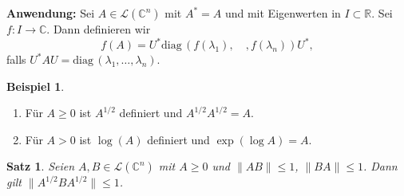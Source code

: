 \documentclass[
paper=a4,
bibtotocnumbered,
liststotocnumbered,
tablecaptionabove,
pointlessnumbers,
twoside,
openright,
10pt
]
{report}
\newcommand{\diag}{\mathrm{diag}\,}
\newtheorem{satz}[thm]{Satz}
\theoremstyle{definition}
\newtheorem*{bsp}{Beispiel}
\numberwithin{equation}{chapter}
\begin{document}
\textbf{Anwendung:} Sei $A\in \mathcal L(\mathbb C^n)$ mit $A^*=A$ und mit Eigenwerten in $I\subset \mathbb R$. Sei $f: I \to \mathbb C$. Dann definieren wir
\begin{equation}
f(A) = U^* \diag(f(\lambda_1), \quad, f(\lambda_n))U^*,
\end{equation}
falls $U^* AU= \diag(\lambda_1, \ldots, \lambda_n)$.
\begin{bsp}
\begin{enumerate}[1)]
\item Für $A\ge 0$ ist $A^{1/2}$ definiert und $A^{1/2} A^{1/2} = A$.
\item Für $A>0$ ist $\log(A)$ definiert
und $\exp(\log A) =A$.
\end{enumerate}
\end{bsp}
\begin{satz}
Seien $A,B\in \mathcal L(\mathbb C^n)$ mit $A\ge 0$ und $\| AB\| \le 1$, $\| BA\| \le 1$. Dann gilt $\|A^{1/2} B A^{1/2}\|\le 1$.
\end{satz}
\end{document}
